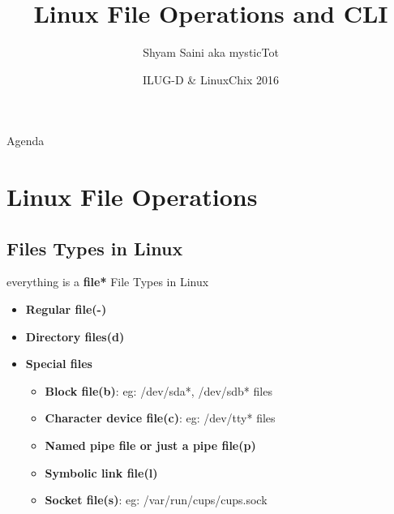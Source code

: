 \documentclass{beamer}
\title{Linux File Operations and CLI }
\author{Shyam Saini aka mysticTot }
\institute[ASET] %
{
  Amity School of Engineering and Technology -- {\em (ASET)} \\
  Department of Computer Science\\
  Amity University
  \center
}
\date{ILUG-D \& LinuxChix 2016}
\begin{document}
\begin{frame}
	\titlepage
\end{frame}

\begin{frame}{Agenda}
	\tableofcontents
\end{frame}

\section{Linux File Operations}

\subsection{Files Types in Linux}

\begin{frame}{everything is a \textbf{file*}} {File Types in Linux}
	{
	\begin{itemize}
	

    \item {
				\textbf{Regular file(-)}
		}
		\end{itemize}
		
    \begin{itemize}
    
	\item{
				\textbf{Directory files(d)}
		}
	\end{itemize}
	
	\begin{itemize}
	\item{
                \textbf{Special files}
                
                \begin{itemize}
		        \item {
				\textbf{Block file(b)}: eg: /dev/sda*, /dev/sdb* files
				\pause
				}
	
				\item {
				\textbf{Character device file(c)}: eg: /dev/tty* files 
				\pause
				}
				
				\item {
				\textbf{Named pipe file or just a pipe file(p)}
				\pause
				}
				
				\item {
				\textbf{Symbolic link file(l)}
				\pause
				}
				
				\item {
				\textbf{Socket file(s)}: eg: /var/run/cups/cups.sock
				}
				
				\end{itemize}
                
                
                
                
                        
            }
    \end{itemize}
    }
    
    \end{frame}
    
\end{document}
